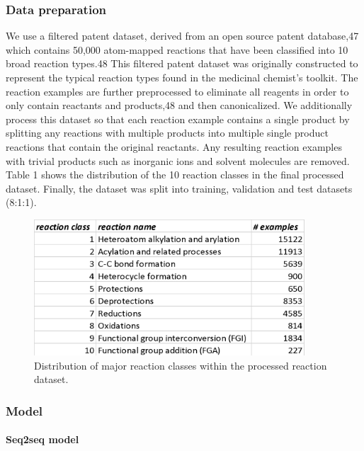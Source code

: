 \subsubsection{Data preparation}

We use a filtered patent dataset, derived from an open source patent database,47 which contains 50,000 atom-mapped reactions that have been classified into 10 broad reaction types.48 This filtered patent dataset was originally constructed to represent the typical reaction types found in the medicinal chemist’s toolkit. The reaction examples are further preprocessed to eliminate all reagents in order to only contain reactants and products,48 and then canonicalized. We additionally process this dataset so that each reaction example contains a single product by splitting any reactions with multiple products into multiple single product reactions that contain the original reactants. Any resulting reaction examples with trivial products such as inorganic ions and solvent molecules are removed. Table 1 shows the distribution of the 10 reaction classes in the final processed dataset. Finally, the dataset was split into training, validation and test datasets (8:1:1). 

\begin{figure}
  \centering
  \includegraphics[width=0.9\textwidth]{Images/ret_table_1.png}
  \caption{Distribution of major reaction classes within the processed reaction dataset.}
  \label{fig:ret_table_1}
\end{figure}

\subsubsection{Model}

\paragraph{Seq2seq model}

